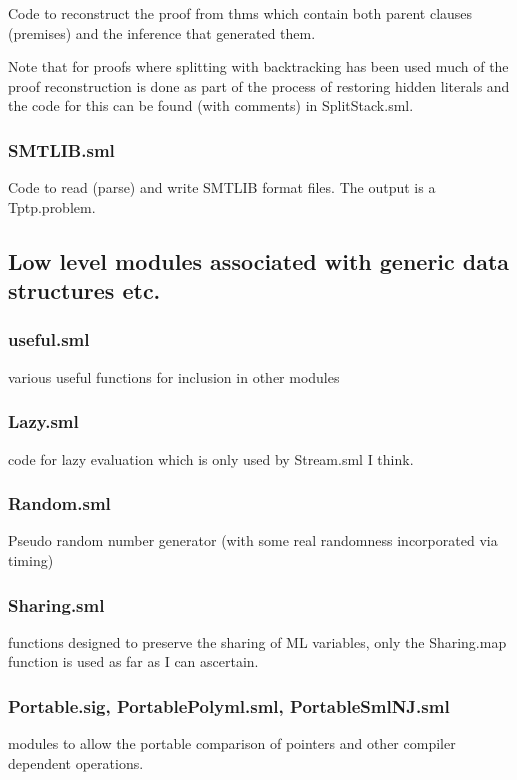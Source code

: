 \documentclass[11pt, oneside]{article}   	%
\begin{document}
Code to reconstruct the proof from thms which contain both parent clauses (premises) and the inference that generated them.

Note that for proofs where splitting with backtracking has been used much of the proof reconstruction is done as part of the
process of restoring hidden literals and the code for this can be found (with comments) in SplitStack.sml.


\subsubsection{SMTLIB.sml}

Code to read (parse) and write SMTLIB format files. The output is a Tptp.problem.


\subsection{Low level modules associated with generic data structures etc.}
\subsubsection{useful.sml}

various useful functions for inclusion in other modules


\subsubsection{Lazy.sml}
code for lazy evaluation which is only used by Stream.sml I think.

\subsubsection{Random.sml}
Pseudo random number generator (with some real randomness incorporated via timing)

\subsubsection{Sharing.sml}
functions designed to preserve the sharing of ML variables, only the
Sharing.map function is used as far as I can ascertain.

\subsubsection{Portable.sig, PortablePolyml.sml, PortableSmlNJ.sml}
modules to allow the portable comparison of pointers and other compiler dependent operations.
\end{document}
